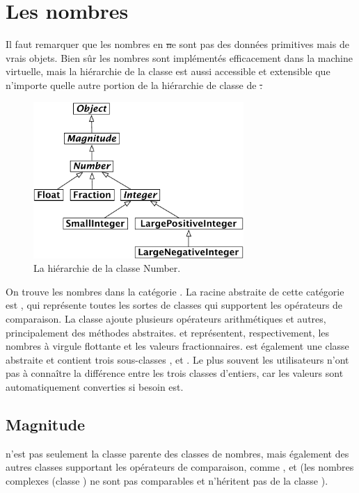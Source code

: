 \documentclass[a4paper,10pt,twoside]{book}
\begin{document}
\section{Les nombres}
Il faut remarquer que les nombres en \st ne sont pas des données primitives mais de vrais objets. Bien sûr les nombres sont implémentés efficacement dans la machine virtuelle, mais la hiérarchie de la classe  est aussi accessible et extensible que n'importe quelle autre portion de la hiérarchie de classe de \st.

\begin{figure}[ht]
\centerline {\includegraphics[width=8cm]{NumberHierarchy}}
\caption{La hiérarchie de la classe Number.}
\end{figure}

On trouve les nombres dans la catégorie . La racine abstraite de cette catégorie est , qui représente toutes les sortes de classes qui supportent les opérateurs de comparaison. La classe  ajoute plusieurs opérateurs arithmétiques et autres, principalement des méthodes abstraites.  et  représentent, respectivement, les nombres à virgule flottante et les valeurs fractionnaires.   est également une classe abstraite et contient trois sous-classes ,  et . Le plus souvent les utilisateurs n'ont pas à connaître la différence entre les trois classes d'entiers, car les valeurs sont automatiquement converties si besoin est.

\subsection{Magnitude}

 n'est pas seulement la classe parente des classes de nombres, mais également des autres classes supportant les opérateurs de comparaison, comme ,  et  (les nombres complexes (classe ) ne sont pas comparables et n'héritent pas de la classe ).
\end{document}

